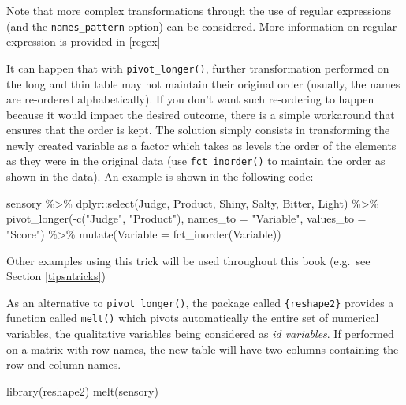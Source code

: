 \documentclass[
]{krantz}
\makeatletter
\newenvironment{Shaded}{\begin{snugshade}}{\end{snugshade}}
\newcommand{\AttributeTok}[1]{\textcolor[rgb]{0.61,0.61,0.61}{#1}}
\newcommand{\FunctionTok}[1]{\textcolor[rgb]{0,0,0}{#1}}
\newcommand{\NormalTok}[1]{#1}
\newcommand{\SpecialCharTok}[1]{\textcolor[rgb]{0,0,0}{#1}}
\newcommand{\StringTok}[1]{\textcolor[rgb]{0.5,0.5,0.5}{#1}}
\renewenvironment{quote}{\begin{VF}}{\end{VF}}
\newenvironment{kframe}{%
\medskip{}
\setlength{\fboxsep}{.8em}
 \def\at@end@of@kframe{}%
 \ifinner\ifhmode%
  \def\at@end@of@kframe{\end{minipage}}%
  \begin{minipage}{\columnwidth}%
 \fi\fi%
 \def\FrameCommand##1{\hskip\@totalleftmargin \hskip-\fboxsep
 \colorbox{shadecolor}{##1}\hskip-\fboxsep
     \hskip-\linewidth \hskip-\@totalleftmargin \hskip\columnwidth}%
 \MakeFramed {\advance\hsize-\width
   \@totalleftmargin\z@ \linewidth\hsize
   \@setminipage}}%
 {\par\unskip\endMakeFramed%
 \at@end@of@kframe}
\renewenvironment{Shaded}{\begin{kframe}}{\end{kframe}}
\makeatother
\begin{document}
Note that more complex transformations through the use of regular expressions (and the \texttt{names\_pattern} option) can be considered. More information on regular expression is provided in \ref{regex}

\begin{quote}
It can happen that with \texttt{pivot\_longer()}, further transformation performed on the long and thin table may not maintain their original order (usually, the names are re-ordered alphabetically). If you don't want such re-ordering to happen because it would impact the desired outcome, there is a simple workaround that ensures that the order is kept. The solution simply consists in transforming the newly created variable as a factor which takes as levels the order of the elements as they were in the original data (use \texttt{fct\_inorder()} to maintain the order as shown in the data). An example is shown in the following code:
\end{quote}

\begin{Shaded}
\begin{Highlighting}[]
\NormalTok{sensory }\SpecialCharTok{\%\textgreater{}\%}
\NormalTok{  dplyr}\SpecialCharTok{::}\FunctionTok{select}\NormalTok{(Judge, Product, Shiny, Salty, Bitter, Light) }\SpecialCharTok{\%\textgreater{}\%}
  \FunctionTok{pivot\_longer}\NormalTok{(}\SpecialCharTok{{-}}\FunctionTok{c}\NormalTok{(}\StringTok{"Judge"}\NormalTok{, }\StringTok{"Product"}\NormalTok{), }
               \AttributeTok{names\_to =} \StringTok{"Variable"}\NormalTok{, }\AttributeTok{values\_to =} \StringTok{"Score"}\NormalTok{) }\SpecialCharTok{\%\textgreater{}\%}
  \FunctionTok{mutate}\NormalTok{(}\AttributeTok{Variable =} \FunctionTok{fct\_inorder}\NormalTok{(Variable))}
\end{Highlighting}
\end{Shaded}

Other examples using this trick will be used throughout this book (e.g.~see Section \ref{tipsntricks})

As an alternative to \texttt{pivot\_longer()}, the package called \texttt{\{reshape2\}} provides a function called \texttt{melt()} which pivots automatically the entire set of numerical variables, the qualitative variables being considered as \emph{id variables}. If performed on a matrix with row names, the new table will have two columns containing the row and column names.

\begin{Shaded}
\begin{Highlighting}[]
\FunctionTok{library}\NormalTok{(reshape2)}
\FunctionTok{melt}\NormalTok{(sensory)}
\end{Highlighting}
\end{Shaded}
\end{document}
